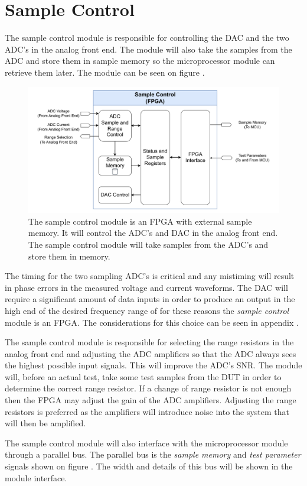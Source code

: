 \section{Sample Control} \label{sec:Sample Control}
The sample control module is responsible for controlling the DAC and the two ADC's in the analog front end. The module will also take the samples from the ADC and store them in sample memory so the microprocessor module can retrieve them later. The module can be seen on figure .

\begin{figure}[H]
    \centering
    \includegraphics[clip, trim=18 0 18 0,width=1\textwidth]{Sections/6_SystemArchitecture/Figures/FPGA.pdf}
    \caption{The sample control module is an FPGA with external sample memory. It will control the ADC's and DAC in the analog front end. The sample control module will take samples from the ADC's and store them in memory.}
    \label{fig_6_3_SampleControl}
\end{figure}

The timing for the two sampling ADC's is critical and any mistiming will result in phase errors in the measured voltage and current waveforms. The DAC will require a significant amount of data inputs in order to produce an output in the high end of the desired frequency range of  for these reasons the \textit{sample control} module is an FPGA. The considerations for this choice can be seen in appendix . 

The sample control module is responsible for selecting the range resistors in the analog front end and adjusting the ADC amplifiers so that the ADC always sees the highest possible input signals. This will improve the ADC's SNR. The module will, before an actual test, take some test samples from the DUT in order to determine the correct range resistor. If a change of range resistor is not enough then the FPGA may adjust the gain of the ADC amplifiers. Adjusting the range resistors is preferred as the amplifiers will introduce noise into the system that will then be amplified.

The sample control module will also interface with the microprocessor module through a parallel bus. The parallel bus is the \textit{sample memory} and \textit{test parameter} signals shown on figure . The width and details of this bus will be shown in the module interface. 